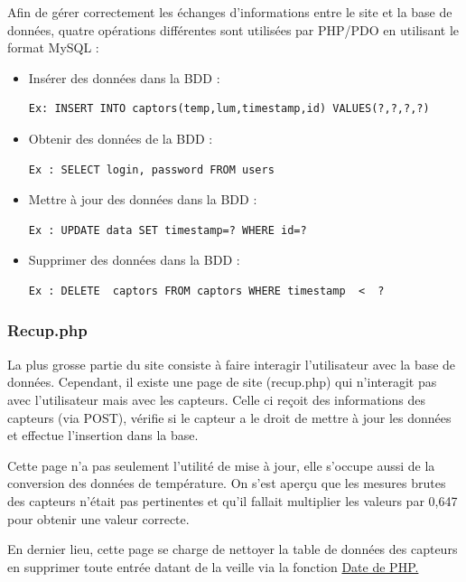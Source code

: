 	\par
	Afin de gérer correctement les échanges d'informations entre le site et la base de données, quatre opérations différentes sont utilisées par PHP/PDO en utilisant le format MySQL :
	\\%
	\begin{itemize}
	\item Insérer des données dans la BDD : 
	\lstset{language=SQL} 
	\begin{lstlisting}[frame=single]
 Ex: INSERT INTO captors(temp,lum,timestamp,id) VALUES(?,?,?,?)
	\end{lstlisting}
	\item Obtenir des données de la BDD : 
	\lstset{language=SQL} 
	\begin{lstlisting}[frame=single]
Ex : SELECT login, password FROM users
	\end{lstlisting}
	\item Mettre à jour des données dans la BDD : 
	\lstset{language=SQL} 
	\begin{lstlisting}[frame=single]
Ex : UPDATE data SET timestamp=? WHERE id=?
	\end{lstlisting}
	\item Supprimer des données dans la BDD : 
	\begin{lstlisting}[frame=single]
Ex : DELETE  captors FROM captors WHERE timestamp  <  ?
	\end{lstlisting}
	\end{itemize}
	\subsubsection{Recup.php}
	\par
	La plus grosse partie du site consiste à faire interagir l'utilisateur avec la base de données. Cependant, il existe une page de site (recup.php) qui n'interagit pas avec l'utilisateur mais avec les capteurs. Celle ci reçoit des informations des capteurs (via POST), vérifie si le capteur a le droit de mettre à jour les données et effectue l'insertion dans la base.
	\par
	Cette page n'a pas seulement l'utilité de mise à jour, elle s'occupe aussi de la conversion des données de température. On s'est aperçu que les mesures brutes des capteurs n'était pas pertinentes et qu'il fallait multiplier les valeurs par 0,647 pour obtenir une valeur correcte.
	\par
	En dernier lieu, cette page se charge de nettoyer la table de données des capteurs en supprimer toute entrée datant de la veille via la fonction \href{http://www.php.net/manual/fr/function.date.php}{Date de PHP.}
